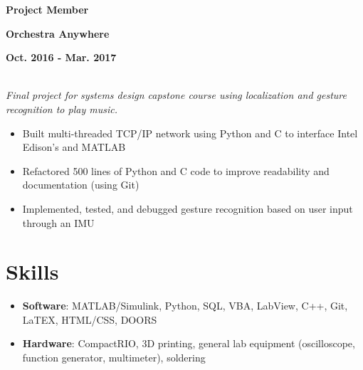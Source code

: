 \documentclass[12pt]{article}
\newcommand\textbox[1]{\parbox{.333\textwidth}{#1}}
\newcommand{\textlcr}[3]{\textbox{\textbf{#1}\hfill}\textbox{\hfil \textbf{#2}\hfil}\textbox{\hfill \textbf{#3}}}
\begin{document}
\textlcr{Project Member}{Orchestra Anywhere}{Oct. 2016 - Mar. 2017}
\\ \textit{Final project for systems design capstone course using localization and gesture recognition to play music.}
\begin{itemize}
\item Built multi-threaded TCP/IP network using Python and C to interface Intel Edison's and MATLAB
\item Refactored 500 lines of Python and C code to improve readability and documentation (using Git)
\item Implemented, tested, and debugged gesture recognition based on user input through an IMU
\end{itemize}

\section*{Skills}
\vspace*{-1em}\makebox[\linewidth]{\rule{\textwidth}{0.4pt}}
\begin{itemize}
\item \textbf{Software}: MATLAB/Simulink, Python, SQL, VBA, LabView, C++, Git, LaTEX, HTML/CSS, DOORS
\item \textbf{Hardware}: CompactRIO, 3D printing, general lab equipment (oscilloscope, function generator, multimeter), soldering
\end{itemize}
\end{document}
